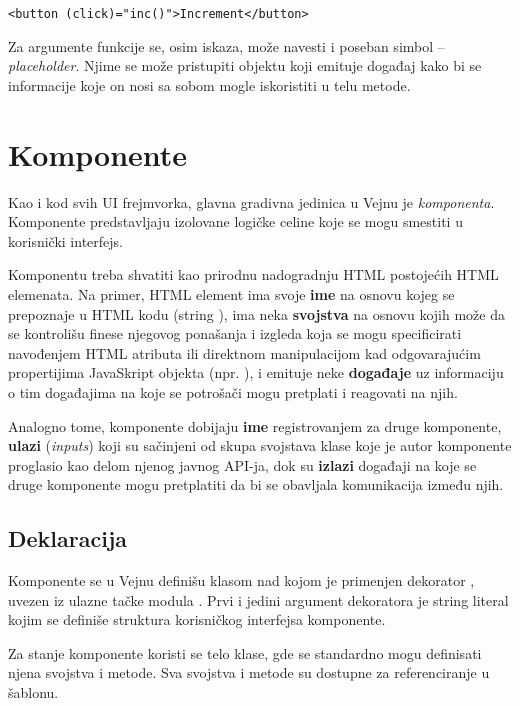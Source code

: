 \begin{verbatim}
<button (click)="inc()">Increment</button>
\end{verbatim}

Za argumente funkcije se, osim iskaza, može navesti i poseban simbol \code{\#} -- \textsl{placeholder}.
Njime se može pristupiti objektu koji emituje događaj kako bi se informacije koje on nosi sa sobom mogle iskoristiti u telu metode.

\section{Komponente}

Kao i kod svih UI frejmvorka, glavna gradivna jedinica u Vejnu je \emph{komponenta}.
Komponente predstavljaju izolovane logičke celine koje se mogu smestiti u korisnički interfejs.

Komponentu treba shvatiti kao prirodnu nadogradnju HTML postojećih HTML elemenata.
Na primer, HTML element  ima svoje \textbf{ime} na osnovu kojeg se prepoznaje u HTML kodu (string ), ima neka \textbf{svojstva} na osnovu kojih može da se kontrolišu finese njegovog ponašanja i izgleda koja se mogu specificirati navođenjem HTML atributa ili direktnom manipulacijom kad odgovarajućim propertijima JavaSkript objekta (npr. ), i emituje neke \textbf{događaje} uz informaciju o tim događajima na koje se potrošači mogu pretplati i reagovati na njih.

Analogno tome, komponente dobijaju \textbf{ime} registrovanjem za druge komponente, \textbf{ulazi} (\textsl{inputs}) koji su sačinjeni od skupa svojstava klase koje je autor komponente proglasio kao delom njenog javnog API-ja, dok su \textbf{izlazi} događaji na koje se druge komponente mogu pretplatiti da bi se obavljala komunikacija između njih.

\subsection{Deklaracija}

Komponente se u Vejnu definišu klasom nad kojom je primenjen dekorator , uvezen iz ulazne tačke modula .
Prvi i jedini argument dekoratora je string literal kojim se definiše struktura korisničkog interfejsa komponente.

Za stanje komponente koristi se telo klase, gde se standardno mogu definisati njena svojstva i metode.
Sva svojstva i metode su dostupne za referenciranje u šablonu.

